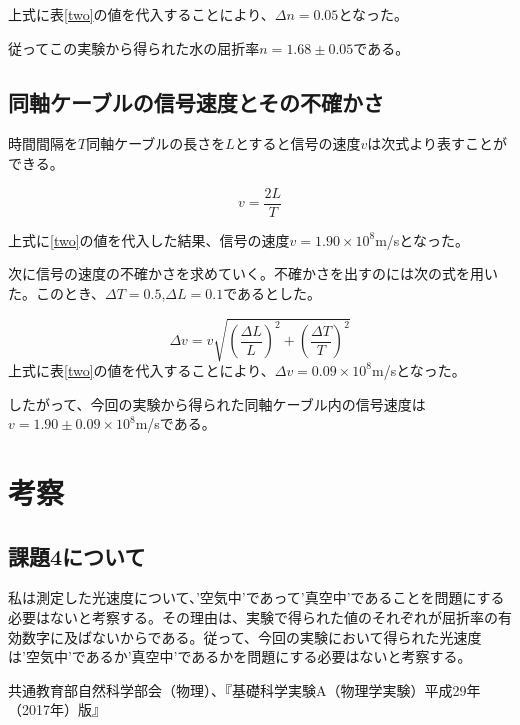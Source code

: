 \documentclass{jsarticle}
\begin{document}
上式に表\ref{two}の値を代入することにより、$\Delta n = 0.05$となった。

従ってこの実験から得られた水の屈折率$n = 1.68 \pm 0.05$である。




\subsection{同軸ケーブルの信号速度とその不確かさ}
時間間隔を$T$同軸ケーブルの長さを$L$とすると信号の速度$v$は次式より表すことができる。

\begin{equation}
    v = \frac{2L}{T}
\end{equation}

上式に\ref{two}の値を代入した結果、信号の速度$v = 1.90 \times 10^8$m/sとなった。\\
\par 次に信号の速度の不確かさを求めていく。不確かさを出すのには次の式を用いた。このとき、$\Delta T = 0.5$,$\Delta L = 0.1$であるとした。

\begin{equation}
    \Delta v = v\sqrt{(\frac{\Delta L}{L})^2 + (\frac{\Delta T}{T})^2}
\end{equation}
上式に表\ref{two}の値を代入することにより、$\Delta v = 0.09 \times 10^8$m/sとなった。

したがって、今回の実験から得られた同軸ケーブル内の信号速度は$v = 1.90 \pm 0.09 \times 10^8$m/sである。



\section{考察}

\subsection{課題4について}
私は測定した光速度について、’空気中’であって’真空中’であることを問題にする必要はないと考察する。その理由は、実験で得られた値のそれぞれが屈折率の有効数字に及ばないからである。従って、今回の実験において得られた光速度は’空気中’であるか’真空中’であるかを問題にする必要はないと考察する。





\begin{thebibliography}{99}
     共通教育部自然科学部会（物理）、『基礎科学実験A（物理学実験）平成29年（2017年）版』
\end{thebibliography}
\end{document}
